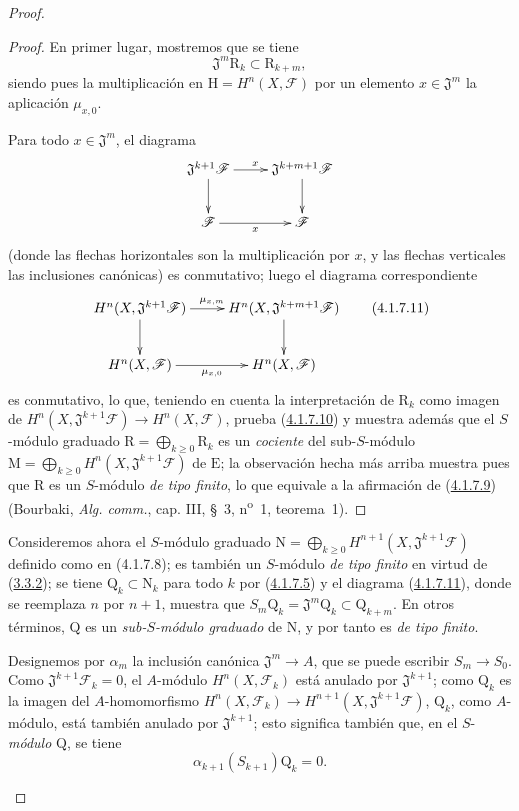 \begin{proof}
\begin{proof}
En primer lugar, mostremos que se tiene
\[
\mathfrak J^m\mathrm R_k\subset\mathrm R_{k+m},
\tag{4.1.7.10}\label{III.4.1.7.10-fr}
\]
siendo pues la multiplicación en $\mathrm H=H^n(X,\mathcal F)$ por un elemento
$x\in\mathfrak J^m$ la aplicación $\mu_{x,0}$.

Para todo
$x\in\mathfrak J^m$, el diagrama
\[
\xymatrix{
\mathfrak J^{k+1}\mathcal F\ar[r]^x\ar[d]&
\mathfrak J^{k+m+1}\mathcal F\ar[d]\\
\mathcal F\ar[r]_x&\mathcal F
}
\]
(donde las flechas horizontales son la multiplicación por $x$, y las
flechas verticales las inclusiones canónicas) es conmutativo; luego el
diagrama correspondiente
\[
\xymatrix{
H^n(X,\mathfrak J^{k+1}\mathcal F)\ar[r]^{\mu_{x,m}}\ar[d]&
H^n(X,\mathfrak J^{k+m+1}\mathcal F)\ar[d]\\
H^n(X,\mathcal F)\ar[r]_{\mu_{x,0}}&H^n(X,\mathcal F)
}
\tag{4.1.7.11}\label{III.4.1.7.11-fr}
\]
es conmutativo, lo que, teniendo en cuenta la interpretación de $\mathrm R_k$
como imagen de
$H^n(X,\mathfrak J^{k+1}\mathcal F)\to H^n(X,\mathcal F)$, prueba
(\hyperref[III.4.1.7.10-fr]{4.1.7.10}) y muestra además que el $S$-módulo
graduado $\mathrm R=\bigoplus_{k\geq0}\mathrm R_k$ es un \emph{cociente} del
sub-$S$-módulo
$\mathrm M=\bigoplus_{k\geq0}H^n(X,\mathfrak J^{k+1}\mathcal F)$ de
$\mathrm E$; la observación hecha más arriba muestra pues que $\mathrm R$ es
un $S$-módulo \emph{de tipo finito}, lo que equivale a la afirmación de
(\hyperref[III.4.1.7.9-fr]{4.1.7.9}) (Bourbaki, \emph{Alg. comm.},
cap. III, §~3, n\textsuperscript{o}~1, teorema~1).
\end{proof}

\begin{env}[4.1.7.12]
\label{III.4.1.7.12-fr}
Consideremos ahora el $S$-módulo graduado
$\mathrm N=\bigoplus_{k\geq0}H^{n+1}(X,\mathfrak J^{k+1}\mathcal F)$
definido como en (4.1.7.8); es también un $S$-módulo \emph{de tipo finito} en
virtud de (\hyperref[III.3.3.2-fr]{3.3.2}); se tiene
$\mathrm Q_k\subset\mathrm N_k$ para todo $k$ por
(\hyperref[III.4.1.7.5-fr]{4.1.7.5}) y el diagrama
(\hyperref[III.4.1.7.11-fr]{4.1.7.11}), donde se reemplaza $n$ por $n+1$,
muestra que
$S_m\mathrm Q_k=\mathfrak J^m\mathrm Q_k\subset\mathrm Q_{k+m}$.
En otros términos, $\mathrm Q$ es un \emph{sub-$S$-módulo graduado} de $\mathrm N$,
y por tanto es \emph{de tipo finito}.
\end{env}

\begin{env}[4.1.7.13]
\label{III.4.1.7.13-fr}
Designemos por $\alpha_m$ la inclusión canónica
$\mathfrak J^m\to A$, que se puede escribir $S_m\to S_0$. Como
$\mathfrak J^{k+1}\mathcal F_k=0$, el $A$-módulo
$H^n(X,\mathcal F_k)$ está anulado por $\mathfrak J^{k+1}$; como
$\mathrm Q_k$ es la imagen del $A$-homomorfismo
$H^n(X,\mathcal F_k)\to H^{n+1}(X,\mathfrak J^{k+1}\mathcal F)$,
$\mathrm Q_k$, como $A$-módulo, está también anulado por
$\mathfrak J^{k+1}$; esto significa también que, en el $S$-\emph{módulo}
$\mathrm Q$, se tiene
\[
\alpha_{k+1}(S_{k+1})\mathrm Q_k=0.
\tag{4.1.7.14}\label{III.4.1.7.14-fr}
\]


\end{env}
\end{proof}
